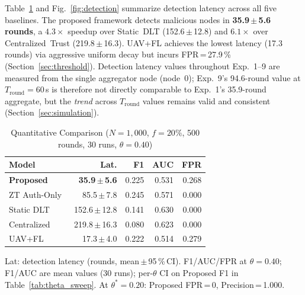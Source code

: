 \documentclass[journal,twoside,10pt]{IEEEtran}
\begin{document}
Table~\ref{tab:comparison} and Fig.~\ref{fig:detection} summarize
detection latency across all five baselines.
The proposed framework detects malicious nodes in
\textbf{35.9\,$\pm$\,5.6 rounds}, a $\mathbf{4.3\times}$ speedup over
Static~DLT (152.6\,$\pm$\,12.8) and $\mathbf{6.1\times}$ over
Centralized~Trust (219.8\,$\pm$\,16.3).
UAV+FL achieves the lowest latency (17.3 rounds) via aggressive uniform
decay but incurs FPR\,=\,27.9\,\% (Section~\ref{sec:threshold}).
Detection latency values throughout Exp.~1--9 are measured from
the single aggregator node (node~0); Exp.~9's 94.6-round value
at $T_{\mathrm{round}}\!=\!60$\,s is therefore not directly
comparable to Exp.~1's 35.9-round aggregate, but the \emph{trend}
across $T_{\mathrm{round}}$ values remains valid and consistent
(Section~\ref{sec:simulation}).

\begin{table}[t]
\centering
\caption{Quantitative Comparison ($N\!=\!1{,}000$, $f\!=\!20\%$,
         500 rounds, 30 runs, $\theta\!=\!0.40$)}
\label{tab:comparison}
\renewcommand{\arraystretch}{1.15}
\small
\begin{tabular}{lrrrr}
\toprule
\textbf{Model} & \textbf{Lat.} & \textbf{F1} & \textbf{AUC} &
\textbf{FPR} \\
\midrule
\textbf{Proposed} & \textbf{35.9\,$\pm$\,5.6}
  & 0.225 & 0.531 & 0.268 \\
ZT Auth-Only~\cite{ztisl} & 85.5\,$\pm$\,7.8
  & 0.245 & 0.571 & 0.000 \\
Static DLT~\cite{nxgent}  & 152.6\,$\pm$\,12.8
  & 0.141 & 0.630 & 0.000 \\
Centralized               & 219.8\,$\pm$\,16.3
  & 0.080 & 0.623 & 0.000 \\
UAV+FL~\cite{uav_fl,tong2024} & 17.3\,$\pm$\,4.0
  & 0.222 & 0.514 & 0.279 \\
\bottomrule
\end{tabular}
{\footnotesize Lat: detection latency (rounds, mean\,$\pm$\,95\,\%\,CI).
 F1/AUC/FPR at $\theta\!=\!0.40$; F1/AUC are mean values (30 runs);
 per-$\theta$ CI on Proposed F1 in Table~\ref{tab:theta_sweep}.
 At $\theta^*\!=\!0.20$: Proposed FPR\,=\,0, Precision\,=\,1.000.}
\end{table}
\end{document}
